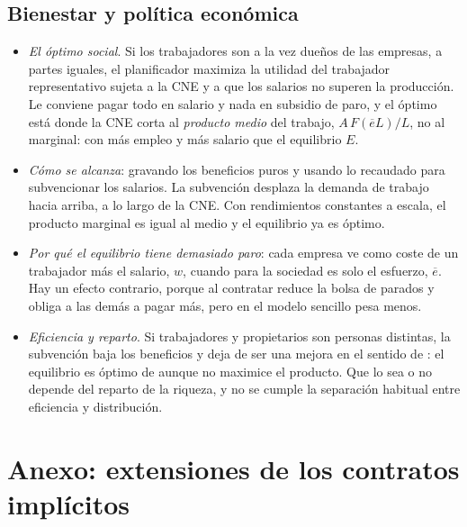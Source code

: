 \documentclass[11pt]{article}
\begin{document}
\subsection{Bienestar y política económica}\label{anexo:ss-bienestar}

\begin{itemize}
\item \emph{El óptimo social}. Si los trabajadores son a la vez dueños de las empresas, a partes iguales, el planificador maximiza la utilidad del trabajador representativo sujeta a la CNE y a que los salarios no superen la producción. Le conviene pagar todo en salario y nada en subsidio de paro, y el óptimo está donde la CNE corta al \emph{producto medio} del trabajo, $A\,F(\overline{e}L)/L$, no al marginal: con más empleo y más salario que el equilibrio $E$\nocite{ShapiroStiglitz1984Equilibrium}.
\item \emph{Cómo se alcanza}: gravando los beneficios puros y usando lo recaudado para subvencionar los salarios. La subvención desplaza la demanda de trabajo hacia arriba, a lo largo de la CNE. Con rendimientos constantes a escala, el producto marginal es igual al medio y el equilibrio ya es óptimo.
\item \emph{Por qué el equilibrio tiene demasiado paro}: cada empresa ve como coste de un trabajador más el salario, $w$, cuando para la sociedad es solo el esfuerzo, $\overline{e}$. Hay un efecto contrario, porque al contratar reduce la bolsa de parados y obliga a las demás a pagar más, pero en el modelo sencillo pesa menos\nocite{ShapiroStiglitz1984Equilibrium}.
\item \emph{Eficiencia y reparto}. Si trabajadores y propietarios son personas distintas, la subvención baja los beneficios y deja de ser una mejora en el sentido de : el equilibrio es óptimo de  aunque no maximice el producto. Que lo sea o no depende del reparto de la riqueza, y no se cumple la separación habitual entre eficiencia y distribución\nocite{ShapiroStiglitz1984Equilibrium}.
\end{itemize}

\section{Anexo: extensiones de los contratos implícitos}\label{anexo:contratos-implicitos}
\end{document}
